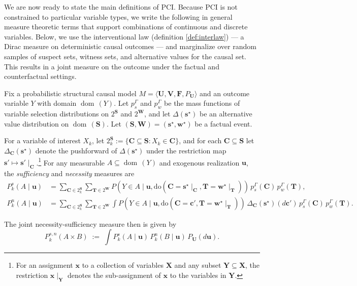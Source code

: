 \documentclass[anon,12pt]{clear2026} %
\newcommand{\ourapproach}{PCI }
\newcommand{\Ourapproach}{PCI}
\newcommand{\dom}{\operatorname{dom}\,}
\begin{document}
We are now ready to state the main definitions of \Ourapproach. Because \ourapproach is not constrained to particular variable types, we write the following in general measure theoretic terms that support combinations of continuous and discrete variables. Below, we use the interventional law (definition \ref{def:interlaw}) — a Dirac measure on deterministic causal outcomes — and marginalize over random samples of suspect sets, witness sets, and alternative values for the causal set. This results in a joint measure on the outcome under the factual and counterfactual settings.

\begin{definition} \label{def:jointnecsuf}
Fix a probabilistic structural causal \linebreak model
$M=\langle \mathbf{U},\mathbf{V},\mathbf{F},P_{\mathbf{U}}\rangle$
and an outcome variable $Y$ with domain $\dom(Y)$.
Let $p_s^\Gamma$ and $p_w^\Gamma$ be the mass functions of variable selection
distributions on $2^{\mathbf{S}}$ and $2^{\mathbf{W}}$, and let
$\Delta(\mathbf{s}^\star)$ be an alternative value distribution on $\dom(\mathbf{S})$.
Let $(\mathbf{S},\mathbf{W})=(\mathbf{s}^\star,\mathbf{w}^\star)$ be a factual event.

For a variable of
interest $X_k$, let
$2^{\mathbf{S}}_{k}:=\{\mathbf{C}\subseteq\mathbf{S}:X_k\in\mathbf{C}\}$,
and for each $\mathbf{C}\subseteq\mathbf{S}$ let
$\Delta_{\mathbf{C}}(\mathbf{s}^\star)$ denote the pushforward of
$\Delta(\mathbf{s}^\star)$ under the restriction map
$\mathbf{s}'\mapsto \mathbf{s}'\!\mid_{\mathbf{C}}$.\footnote{For an assignment $\mathbf{x}$ to a collection of variables $\mathbf{X}$ and any subset $\mathbf{Y}\subseteq\mathbf{X}$, the restriction $\mathbf{x}\!\mid_{\mathbf{Y}}$ denotes the sub-assignment of $\mathbf{x}$ to the variables in $\mathbf{Y}$.}
For any measurable $A\subseteq\dom(Y)$ and exogenous realization $\mathbf{u}$, the \emph{sufficiency} and \emph{necessity} measures are
\begin{align}
P_k^{s}(A\mid\mathbf{u})
&=
\sum_{\mathbf{C}\in 2^{\mathbf{S}}_{k}}
\sum_{\mathbf{T}\in 2^{\mathbf{W}}}
P\!\left(Y\in A \mid \mathbf{u},
\mathrm{do}\!\left(\mathbf{C}=\mathbf{s}^\star\!\mid_{\mathbf{C}},
\mathbf{T}=\mathbf{w}^\star\!\mid_{\mathbf{T}}\right)\right)
\,p_s^\Gamma(\mathbf{C})\,p_w^\Gamma(\mathbf{T}),
\\[6pt]
P_k^{n}(A\mid\mathbf{u})
&=
\sum_{\mathbf{C}\in 2^{\mathbf{S}}_{k}}
\sum_{\mathbf{T}\in 2^{\mathbf{W}}}
\int
P\!\left(Y\in A \mid \mathbf{u},
\mathrm{do}\!\left(\mathbf{C}=\mathbf{c}',\mathbf{T}=\mathbf{w}^\star\!\mid_{\mathbf{T}}\right)\right)
\,\Delta_{\mathbf{C}}(\mathbf{s}^\star)(d\mathbf{c}')
\,p_s^\Gamma(\mathbf{C})\,p_w^\Gamma(\mathbf{T}).
\end{align}

The joint necessity-sufficiency measure then is given by
\begin{equation}
P_k^{s,n}(A\times B)
\;:=\;
\int
P_k^{s}(A\mid\mathbf{u})\,
P_k^{n}(B\mid\mathbf{u})\,
P_{\mathbf{U}}(d\mathbf{u}).
\end{equation}

\end{definition}
\end{document}
